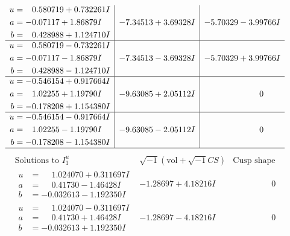 \documentclass[1p]{elsarticle_modified}
\theoremstyle{definition}
\newcommand{\I}{\sqrt{-1}}
\begin{document}
$$\begin{array}{c|c|c}
\begin{aligned}
u &= \phantom{-}0.580719 + 0.732261 I \\
a &= -0.07117 + 1.86879 I \\
b &= \phantom{-}0.428988 + 1.124710 I\end{aligned}
 & -7.34513 + 3.69328 I & -5.70329 - 3.99766 I \\ \hline\begin{aligned}
u &= \phantom{-}0.580719 - 0.732261 I \\
a &= -0.07117 - 1.86879 I \\
b &= \phantom{-}0.428988 - 1.124710 I\end{aligned}
 & -7.34513 - 3.69328 I & -5.70329 + 3.99766 I \\ \hline\begin{aligned}
u &= -0.546154 + 0.917664 I \\
a &= \phantom{-}1.02255 + 1.19790 I \\
b &= -0.178208 + 1.154380 I\end{aligned}
 & -9.63085 + 2.05112 I & \phantom{-0.000000 } 0 \\ \hline\begin{aligned}
u &= -0.546154 - 0.917664 I \\
a &= \phantom{-}1.02255 - 1.19790 I \\
b &= -0.178208 - 1.154380 I\end{aligned}
 & -9.63085 - 2.05112 I & \phantom{-0.000000 } 0\\
 \hline 
 \end{array}$$\newpage$$\begin{array}{c|c|c}  
\text{Solutions to }I^u_{1}& \I (\text{vol} + \sqrt{-1}CS) & \text{Cusp shape}\\
 \hline 
\begin{aligned}
u &= \phantom{-}1.024070 + 0.311697 I \\
a &= \phantom{-}0.41730 - 1.46428 I \\
b &= -0.032613 - 1.192350 I\end{aligned}
 & -1.28697 + 4.18216 I & \phantom{-0.000000 } 0 \\ \hline\begin{aligned}
u &= \phantom{-}1.024070 - 0.311697 I \\
a &= \phantom{-}0.41730 + 1.46428 I \\
b &= -0.032613 + 1.192350 I\end{aligned}
 & -1.28697 - 4.18216 I & \phantom{-0.000000 } 0 \\ \hline\begin{aligned}

\end{aligned}
\end{array}$$
\end{document}
